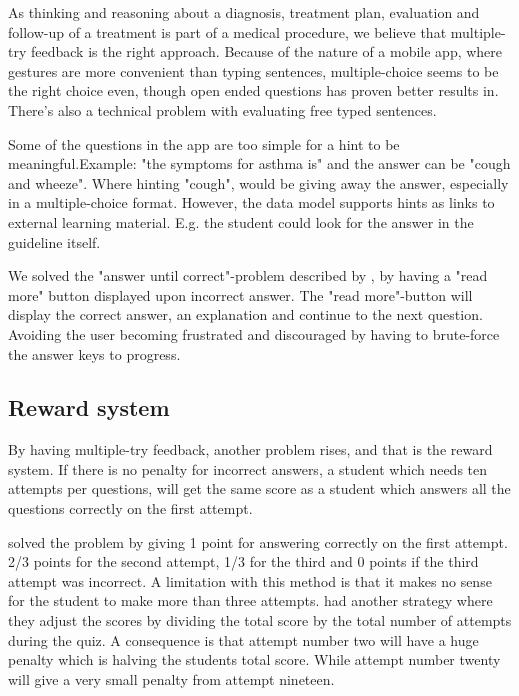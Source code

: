 \documentclass[a4paper,12pt]{book}
\begin{document}


As thinking and reasoning about a diagnosis, treatment plan, evaluation and follow-up of a treatment is part of a medical procedure, we believe that multiple-try feedback is the right approach. Because of the nature of a mobile app, where gestures are more convenient than typing sentences, multiple-choice seems to be the right choice even, though open ended questions has proven better results in. There's also a technical problem with evaluating free typed sentences.

Some of the questions in the app are too simple for a hint to be meaningful.Example: "the symptoms for asthma is" and the answer can be "cough and wheeze". Where hinting "cough", would be giving away the answer, especially in a multiple-choice format. However, the data model supports hints as links to external learning material. E.g. the student could look for the answer in the guideline itself.

We solved the "answer until correct"-problem described by \textcite{Morrison1995}, by having a "read more" button displayed upon incorrect answer. The "read more"-button will display the correct answer, an explanation and continue to the next question. Avoiding the user becoming frustrated and discouraged by having to brute-force the answer keys to progress.




\subsection{Reward system}
By having multiple-try feedback, another problem rises, and that is the reward system. If there is no penalty for incorrect answers, a student which needs ten attempts per questions, will get the same score as a student which answers all the questions correctly on the first attempt.

\textcite{Attali2015} solved the problem by giving 1 point for answering correctly on the first attempt. 2/3 points for the second attempt, 1/3 for the third and 0 points if the third attempt was incorrect. A limitation with this method is that it makes no sense for the student to make more than three attempts. \textcite{Morrison1995} had another strategy where they adjust the scores by dividing the total score by the total number of attempts during the quiz. A consequence is that attempt number two will have a huge penalty which is halving the students total score. While attempt number twenty will give a very small penalty from attempt nineteen.
\end{document}
